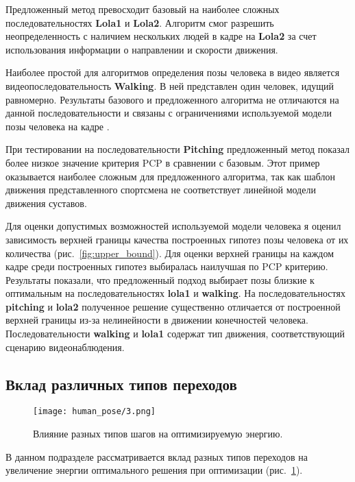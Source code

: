 Предложенный метод превосходит базовый на наиболее сложных последовательностях \textbf{Lola1} и \textbf{Lola2}. Алгоритм смог разрешить неопределенность с наличием нескольких людей в кадре на \textbf{Lola2} за счет использования информации о направлении и скорости движения.

Наиболее простой для алгоритмов определения позы человека в видео является видеопоследовательность \textbf{Walking}. В ней представлен один человек, идущий равномерно. Результаты базового и предложенного алгоритма не отличаются на данной последовательности и связаны с ограничениями используемой модели позы человека на кадре \cite{yang2011articulated}.

При тестировании на последовательности \textbf{Pitching} предложенный метод показал более низкое значение критерия PCP в сравнении с базовым. Этот пример оказывается наиболее сложным для предложенного алгоритма, так как шаблон движения представленного спортсмена не соответствует линейной модели движения суставов.

Для оценки допустимых возможностей используемой модели человека \cite{park2011n} я оценил зависимость верхней границы качества построенных гипотез позы человека от их количества (рис.~\ref{fig:upper_bound}). Для оценки верхней границы на каждом кадре среди построенных гипотез выбиралась наилучшая по PCP критерию. Результаты показали, что предложенный подход выбирает позы близкие к оптимальным на последовательностях \textbf{lola1} и \textbf{walking}. На последовательностях \textbf{pitching} и \textbf{lola2} полученное решение существенно отличается от построенной верхней границы из-за нелинейности в движении конечностей человека. Последовательности \textbf{walking} и \textbf{lola1} содержат тип движения, соответствующий сценарию видеонаблюдения.

\iffalse
\subsection{Вклад различных типов переходов}

\begin{figure}[t]
	\begin{center}
		\texttt{[image: human\_pose/3.png]}
		\caption{Влияние разных типов шагов на оптимизируемую энергию.}
		\label{fig:impact}
	\end{center}
\end{figure}

В данном подразделе рассматривается вклад разных типов переходов на увеличение энергии оптимального решения при оптимизации (рис.~\ref{fig:impact}).

